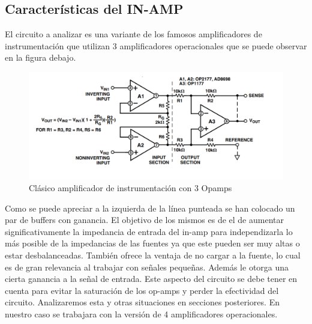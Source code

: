 \documentclass[a4paper]{article}
\begin{document}
	\subsection{Características del IN-AMP}
	El circuito a analizar es una variante de los famosos amplificadores de instrumentación que utilizan 3 amplificadores operacionales que se puede observar en la figura debajo.
	\begin{figure}[H]
		\centering
		\includegraphics[width=\linewidth]{../ImagenesVarias/inAmp3Opamp}
		\caption{Clásico amplificador de instrumentación con 3 Opamps}
	\end{figure}
		
	Como se puede apreciar a la izquierda de la línea punteada se han colocado un par de buffers con ganancia. El objetivo de los mismos es de el de aumentar significativamente la impedancia de entrada del in-amp para independizarla lo más posible de la impedancias de las fuentes ya que este pueden ser muy altas o estar desbalanceadas. También ofrece la ventaja de no cargar a la fuente, lo cual es de gran relevancia al trabajar con señales pequeñas. Además le otorga una cierta ganancia a la señal de entrada. Este aspecto del circuito se debe tener en cuenta para evitar la saturación de los op-amps y perder la efectividad del circuito. Analizaremos esta y otras situaciones en secciones posteriores.
	En nuestro caso se trabajara con la versión de 4 amplificadores operacionales.
	
\end{document}
